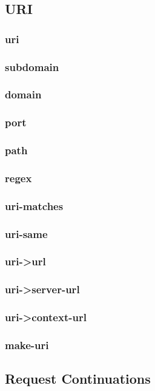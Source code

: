 \subsection{URI}\label{sec:lib uri}
\subsubsection{uri}
\subsubsection{subdomain}
\subsubsection{domain}
\subsubsection{port}
\subsubsection{path}
\subsubsection{regex}
\subsubsection{uri-matches}
\subsubsection{uri-same}
\subsubsection{uri->url}
\subsubsection{uri->server-url}
\subsubsection{uri->context-url}
\subsubsection{make-uri}
\newpage
\subsection{Request Continuations}\label{sec:lib request continuations}
